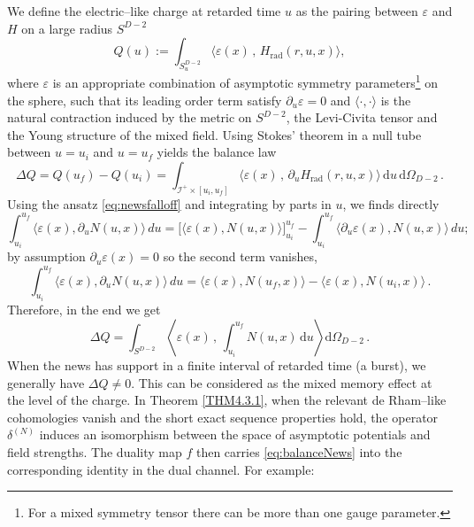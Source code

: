 \documentclass[a4paper,12pt]{article}
\begin{document}
We define the electric–like charge at retarded time \( u \) as the pairing between \( \varepsilon \) and \( H \) on a large radius \( S^{D-2} \)
\begin{equation}\label{eq:charge}
Q(u) := \int_{S^{D-2}_{u}} \langle \varepsilon(x) \,,\, H_{\text{rad}}(r,u,x) \rangle,
\end{equation}
where \( \varepsilon \) is an appropriate combination of asymptotic symmetry parameters\footnote{For a mixed symmetry  tensor there can be more than one gauge parameter.} on the sphere, such that its leading order term satisfy \( \partial_{u}\varepsilon=0 \) and  \( \langle \cdot,\cdot \rangle \) is the natural contraction induced by the metric on \( S^{D-2} \), the Levi-Civita tensor and the Young structure of the mixed field. Using Stokes’ theorem in a null tube between \( u=u_i \) and \( u=u_f \) yields the balance law
\begin{equation}\label{eq:balance}
\Delta Q = Q(u_f)-Q(u_i)
= \int_{\mathcal{I}^{+} \times [u_i,u_f]} \langle \varepsilon(x) \,,\,  \partial_{u} H_{\text{rad}}(r,u,x)\rangle\, \mathrm{d}u\, \mathrm{d}\Omega_{D-2} \, .
\end{equation}
Using the ansatz \eqref{eq:newsfalloff} and integrating by parts in $u$, we finds directly
\begin{equation}
\int_{u_i}^{u_f} \langle \varepsilon(x), \partial_u N(u,x) \rangle \, du
= \Big[ \langle \varepsilon(x), N(u,x) \rangle \Big]_{u_i}^{u_f}
- \int_{u_i}^{u_f} \langle \partial_u \varepsilon(x), N(u,x) \rangle \, du;
\end{equation}
by assumption \(\partial_u \varepsilon(x) = 0\) so the second term vanishes, 
\begin{equation}
\int_{u_i}^{u_f} \langle \varepsilon(x), \partial_u N(u,x) \rangle \, du
= \langle \varepsilon(x), N(u_f,x) \rangle
- \langle \varepsilon(x), N(u_i,x) \rangle \, .
\end{equation}
Therefore, in the end we get
\begin{equation}\label{eq:balanceNews}
\Delta Q
= \int_{S^{D-2}} \left\langle \varepsilon(x) \,,\, \int_{u_i}^{u_f} N(u,x)\,\mathrm{d}u \right\rangle \mathrm{d}\Omega_{D-2} \, .
\end{equation}
When the news has support in a finite interval of retarded time (a burst), we generally have \( \Delta Q\neq 0 \).  
This can be considered as the mixed memory effect at the level of the charge. In Theorem \ref{THM4.3.1}, when the relevant de Rham–like cohomologies vanish and the short exact sequence properties hold, the operator \( \delta^{(N)} \) induces an isomorphism between the space of asymptotic potentials and field strengths. The duality map \( f \) then carries \eqref{eq:balanceNews} into the corresponding identity in the dual channel. For example:
\end{document}
